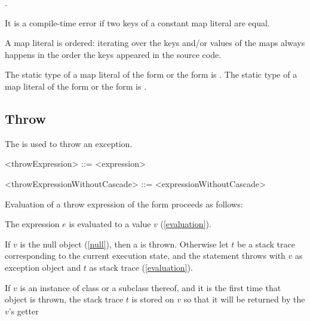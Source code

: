 \documentclass[makeidx]{article}
\begin{document}
.

\LMHash{}%
It is a compile-time error if two keys of a constant map literal are equal.

\LMHash{}%
A map literal is ordered: iterating over the keys and/or values of the maps always happens in the
 order the keys appeared in the source code.


\LMHash{}%
The static type of a map literal of the form
or the form
is
.
The static type of a map literal of the form
or the form
 is
.


\subsection{Throw}

\LMHash{}%
The  is used to throw an exception.

\begin{grammar}
<throwExpression> ::= \THROW{} <expression>

<throwExpressionWithoutCascade> ::= \THROW{} <expressionWithoutCascade>
\end{grammar}

\LMHash{}%
Evaluation of a throw expression of the form  proceeds as follows:

\LMHash{}%
The expression $e$ is evaluated to a value $v$ (\ref{evaluation}).


\LMHash{}%
If $v$ is the null object (\ref{null}), then a  is thrown.
Otherwise let $t$ be a stack trace corresponding to the current execution state,
and the \THROW{} statement throws with $v$ as exception object
and $t$ as stack trace (\ref{evaluation}).

\LMHash{}%
If $v$ is an instance of class  or a subclass thereof,
and it is the first time that  object is thrown,
the stack trace $t$ is stored on $v$ so that it will be returned
by the $v$'s  getter
\end{document}
